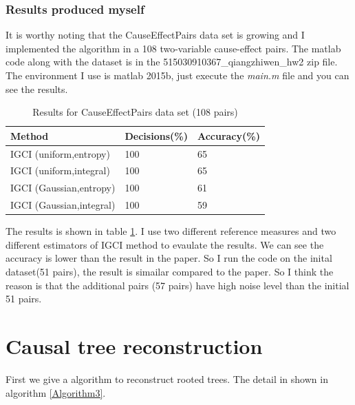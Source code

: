 \documentclass{article}
\theoremstyle{definition}
\numberwithin{equation}{section}
\numberwithin{figure}{section}
\begin{document}
\subsubsection{Results produced myself}
It is worthy noting that the CauseEffectPairs data set is growing and I implemented the algorithm in a 108 two-variable cause-effect pairs.
The matlab code along with the dataset is in the 515030910367\_qiangzhiwen\_hw2 zip file. The environment I use is matlab 2015b, just execute the \textit{main.m} file and you can see the results.

\begin{table}[htbp]
\centering
\caption{Results for CauseEffectPairs data set (108 pairs)}
\label{table2}
\begin{tabular}{lll}
\hline
 Method& Decisions(\%) & Accuracy(\%)   \\ \hline
 IGCI (uniform,entropy)& 100& 65\\
 IGCI (uniform,integral)& 100& 65\\
 IGCI (Gaussian,entropy)& 100& 61\\
 IGCI (Gaussian,integral)& 100& 59
\end{tabular}
\end{table}
The results is shown in table \ref{table2}. I use two different reference measures and two different estimators of IGCI method to evaulate the results. We can see the accuracy is lower than the result in the paper. So I run the code on the inital dataset(51 pairs), the result is simailar compared to the paper. So I think the reason is that the additional pairs (57 pairs) have high noise level than the initial 51 pairs. 
\section{Causal tree reconstruction}
First we give a algorithm to reconstruct rooted trees. The detail in shown in algorithm \ref{Algorithm3}. 
\end{document}
